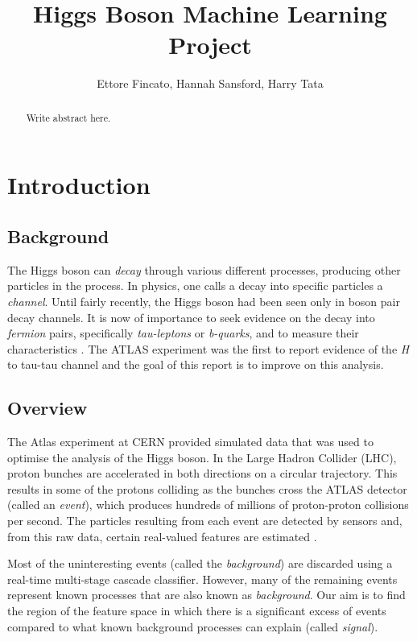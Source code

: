\documentclass[]{article}
\title{Higgs Boson Machine Learning Project}
\author{Ettore Fincato, Hannah Sansford, Harry Tata}
\begin{document}
\maketitle

\begin{abstract}

Write abstract here.

\end{abstract}

\section{Introduction}

\subsection{Background}

The Higgs boson can \textit{decay} through various different processes, producing other particles in the process. In physics, one calls a decay into specific particles a \textit{channel}. Until fairly recently, the Higgs boson had been seen only in boson pair decay channels. It is now of importance to seek evidence on the decay into \textit{fermion} pairs, specifically \textit{tau-leptons} or \textit{b-quarks}, and to measure their characteristics \cite{higgs-challenge}. The ATLAS experiment \cite{ATLAS-experiment} was the first to report evidence of the \textit{H} to tau-tau channel and the goal of this report is to improve on this analysis.


\subsection{Overview}

The Atlas experiment at CERN provided simulated data that was used to optimise the analysis of the Higgs boson. In the Large Hadron Collider (LHC), proton bunches are accelerated in both directions on a circular trajectory. This results in some of the protons colliding as the bunches cross the ATLAS detector (called an \textit{event}), which produces hundreds of millions of proton-proton collisions per second. The particles resulting from each event are detected by sensors and, from this raw data, certain real-valued features are estimated \cite{higgs-challenge}.

Most of the uninteresting events (called the \textit{background}) are discarded using a real-time multi-stage cascade classifier. However, many of the remaining events represent known processes that are also known as \textit{background}. Our aim is to find the region of the feature space in which there is a significant excess of events compared to what known background processes can explain (called \textit{signal}).
\end{document}
